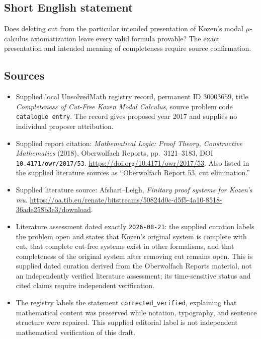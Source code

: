 \documentclass[11pt]{article}
\begin{document}
\subsection{Short English statement}
Does deleting cut from the particular intended presentation of Kozen's modal \(\mu\)-calculus axiomatization leave every valid formula provable? The exact presentation and intended meaning of completeness require source confirmation.
\subsection{Sources}
\begin{itemize}
\item Supplied local UnsolvedMath registry record, permanent ID \(30003659\), title \emph{Completeness of Cut-Free Kozen Modal Calculus}, source problem code \texttt{catalogue entry}. The record gives proposed year 2017 and supplies no individual proposer attribution.
\item Supplied report citation: \emph{Mathematical Logic: Proof Theory, Constructive Mathematics} (2018), Oberwolfach Reports, pp.\ 3121--3183, DOI \texttt{10.4171/owr/2017/53}. \url{https://doi.org/10.4171/owr/2017/53}. Also listed in the supplied literature sources as ``Oberwolfach Report 53, cut elimination.''
\item Supplied literature source: Afshari--Leigh, \emph{Finitary proof systems for Kozen's mu}. \url{https://oa.tib.eu/renate/bitstreams/50824d0c-d5f5-4a10-8518-36ade258b3e3/download}.
\item Literature assessment dated exactly \texttt{2026-08-21}: the supplied curation labels the problem open and states that Kozen's original system is complete with cut, that complete cut-free systems exist in other formalisms, and that completeness of the original system after removing cut remains open. This is supplied dated curation derived from the Oberwolfach Reports material, not an independently verified literature assessment; its time-sensitive status and cited claims require independent verification.
\item The registry labels the statement \texttt{corrected\_verified}, explaining that mathematical content was preserved while notation, typography, and sentence structure were repaired. This supplied editorial label is not independent mathematical verification of this draft.
\end{itemize}
\end{document}
